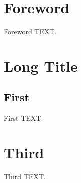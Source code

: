 \documentclass{svmult}
\begin{document}
\frontmatter
\chapter{Foreword}
Foreword TEXT.
\mainmatter
\chapter{Long Title}
\section{First}
First TEXT.
\chapter{Third}
Third TEXT.
\end{document}
